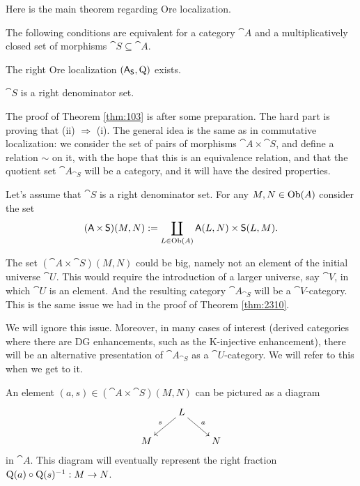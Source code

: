 Here is the main theorem regarding Ore localization. 

\begin{thm} \label{thm:103}
The following conditions are equivalent for a category $\cat{A}$ 
and a multiplicatively closed set of morphisms $\cat{S} \subseteq \cat{A}$. 
\begin{enumerate}
 The right Ore localization
$(\operatorname{\mathsf{A}}_{\operatorname{\mathsf{S}}}, \operatorname{Q})$ exists.

 $\cat{S}$ is a right denominator set.
\end{enumerate}
\end{thm}

The proof of Theorem \ref{thm:103} is after some preparation. 
The hard part is proving that (ii) $\Rightarrow$ (i). 
The general idea is the same as in 
commutative localization: we consider the set of pairs of morphisms
$\cat{A} \times \cat{S}$, and define a relation $\sim$ on it, with the hope 
that this is an equivalence relation, and that the quotient set 
$\cat{A}_{\cat{S}}$ will be a category, and it will have the desired 
properties. 

Let's assume that $\cat{S}$ is a right denominator set. 
For any $M, N \in \operatorname{Ob}(A)$ consider the set 
\[ (\operatorname{\mathsf{A}} \times \operatorname{\mathsf{S}})(M, N) :=  
\coprod_{L \in \operatorname{Ob}(A)} 
\operatorname{\mathsf{A}}(L, N) \times \operatorname{\mathsf{S}}(L, M) . \]

\begin{rem} \label{rem:1405}
The set $(\cat{A} \times \cat{S})(M, N)$ could be big, namely not an element 
of the initial universe $\cat{U}$. This would require the introduction of a 
larger universe, say $\cat{V}$, in which $\cat{U}$ is an element. 
And the resulting category $\cat{A}_{\cat{S}}$ will be a 
$\cat{V}$-category. This is the same issue we had in the proof of Theorem 
\ref{thm:2310}. 

We will ignore this issue. Moreover, in many cases of interest (derived 
categories where there are DG enhancements, such as the K-injective 
enhancement), there will be an alternative presentation of $\cat{A}_{\cat{S}}$
as a $\cat{U}$-category. We will refer to this when we get to it. 
\end{rem}

An element 
$(a, s) \in (\cat{A} \times \cat{S})(M, N)$ can be pictured as a diagram
\begin{equation} \label{eqn:1408}
\UseTips  \xymatrix @C=5ex @R=4ex  {
& L 
\ar[dl]_{s}
\ar[dr]^{a}
\\
M 
& &
N
}
\end{equation}
in $\cat{A}$.
This diagram will eventually represent the right fraction 
$\operatorname{Q}(a) \circ \operatorname{Q}(s)^{-1} : M \to N$.

